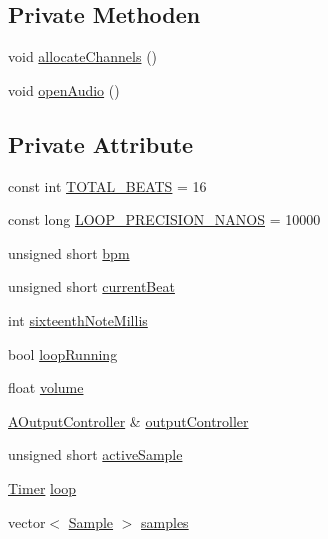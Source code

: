 \subsection*{Private Methoden}
\begin{DoxyCompactItemize}
\item 
void \hyperlink{class_drum_machine_a5a42497c3a1f390537b6c12fddab1619}{allocate\+Channels} ()
\item 
void \hyperlink{class_drum_machine_afd65a07ff84b6c7854ddd9ee3a529382}{open\+Audio} ()
\end{DoxyCompactItemize}
\subsection*{Private Attribute}
\begin{DoxyCompactItemize}
\item 
const int \hyperlink{class_drum_machine_a455f582474a17cbd618940a3d4a4791d}{T\+O\+T\+A\+L\+\_\+\+B\+E\+A\+TS} = 16
\item 
const long \hyperlink{class_drum_machine_aefcf483d61e72bec26f9215a800c705c}{L\+O\+O\+P\+\_\+\+P\+R\+E\+C\+I\+S\+I\+O\+N\+\_\+\+N\+A\+N\+OS} = 10000
\item 
unsigned short \hyperlink{class_drum_machine_afaa80be4a66f759ab590a5f67f327b67}{bpm}
\item 
unsigned short \hyperlink{class_drum_machine_a46f20be98c71d1429a473e03bf092df3}{current\+Beat}
\item 
int \hyperlink{class_drum_machine_a55ad96f0aa2452d631e49bcdde9fd538}{sixteenth\+Note\+Millis}
\item 
bool \hyperlink{class_drum_machine_a4ac5a8c113e5a32a557f069e8d93cca8}{loop\+Running}
\item 
float \hyperlink{class_drum_machine_af1401c2a8e1d016ec32c662968e581fd}{volume}
\item 
\hyperlink{class_a_output_controller}{A\+Output\+Controller} \& \hyperlink{class_drum_machine_a4a5b4d6cc6e4a3ce2c2893e52fd0e951}{output\+Controller}
\item 
unsigned short \hyperlink{class_drum_machine_a9e12916e5724251791689e6f14c8513a}{active\+Sample}
\item 
\hyperlink{class_timer}{Timer} \hyperlink{class_drum_machine_ab190b1b114840e3fb41fff54d0099e93}{loop}
\item 
vector$<$ \hyperlink{class_sample}{Sample} $>$ \hyperlink{class_drum_machine_acf215ead70c41e760556497281aa562e}{samples}
\end{DoxyCompactItemize}


